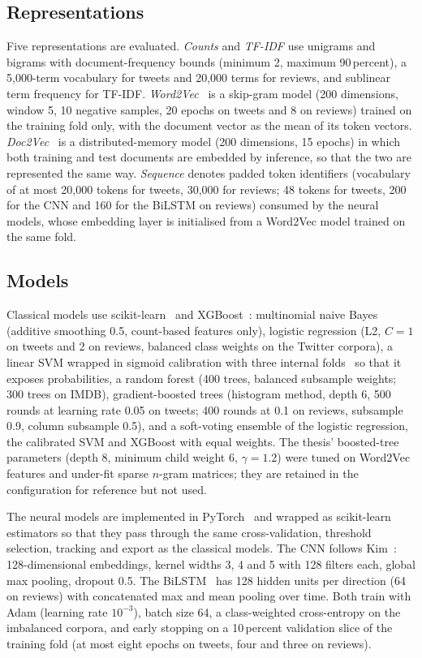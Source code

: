 \documentclass[journal,10pt]{IEEEtran}
\begin{document}
\subsection{Representations}
Five representations are evaluated. \emph{Counts} and \emph{TF-IDF} use unigrams and bigrams with document-frequency bounds (minimum 2, maximum 90\,percent), a 5,000-term vocabulary for tweets and 20,000 terms for reviews, and sublinear term frequency for TF-IDF. \emph{Word2Vec}~\cite{mikolov2013} is a skip-gram model (200 dimensions, window 5, 10 negative samples, 20 epochs on tweets and 8 on reviews) trained on the training fold only, with the document vector as the mean of its token vectors. \emph{Doc2Vec}~\cite{le2014} is a distributed-memory model (200 dimensions, 15 epochs) in which both training and test documents are embedded by inference, so that the two are represented the same way. \emph{Sequence} denotes padded token identifiers (vocabulary of at most 20,000 tokens for tweets, 30,000 for reviews; 48 tokens for tweets, 200 for the CNN and 160 for the BiLSTM on reviews) consumed by the neural models, whose embedding layer is initialised from a Word2Vec model trained on the same fold.

\subsection{Models}
Classical models use scikit-learn~\cite{pedregosa2011} and XGBoost~\cite{chen2016}: multinomial naive Bayes (additive smoothing 0.5, count-based features only), logistic regression (L2, $C{=}1$ on tweets and 2 on reviews, balanced class weights on the Twitter corpora), a linear SVM wrapped in sigmoid calibration with three internal folds~\cite{platt1999} so that it exposes probabilities, a random forest (400 trees, balanced subsample weights; 300 trees on IMDB), gradient-boosted trees (histogram method, depth 6, 500 rounds at learning rate 0.05 on tweets; 400 rounds at 0.1 on reviews, subsample 0.9, column subsample 0.5), and a soft-voting ensemble of the logistic regression, the calibrated SVM and XGBoost with equal weights. The thesis' boosted-tree parameters (depth 8, minimum child weight 6, $\gamma{=}1.2$) were tuned on Word2Vec features and under-fit sparse $n$-gram matrices; they are retained in the configuration for reference but not used.

The neural models are implemented in PyTorch~\cite{paszke2019} and wrapped as scikit-learn estimators so that they pass through the same cross-validation, threshold selection, tracking and export as the classical models. The CNN follows Kim~\cite{kim2014}: 128-dimensional embeddings, kernel widths 3, 4 and 5 with 128 filters each, global max pooling, dropout 0.5. The BiLSTM~\cite{hochreiter1997} has 128 hidden units per direction (64 on reviews) with concatenated max and mean pooling over time. Both train with Adam (learning rate $10^{-3}$), batch size 64, a class-weighted cross-entropy on the imbalanced corpora, and early stopping on a 10\,percent validation slice of the training fold (at most eight epochs on tweets, four and three on reviews).
\end{document}
